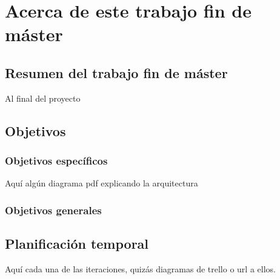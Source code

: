 \chapter{Acerca de este trabajo fin de máster}
\label{cha:introduction}


\section{Resumen del trabajo fin de máster}

Al final del proyecto

\section{Objetivos}

\subsection{Objetivos específicos}

Aquí algún diagrama pdf explicando la arquitectura

\subsection{Objetivos generales}

\section{Planificación temporal}

Aquí cada una de las iteraciones, quizás diagramas de trello o url a ellos.

